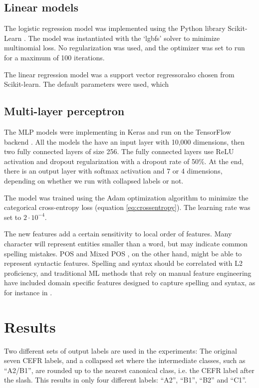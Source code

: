 \subsection{Linear models}

The logistic regression model was implemented using the Python library
Scikit-Learn \autocite{scikit-learn}. The model was instantiated with the
`lgbfs' solver to minimize multinomial loss. No regularization was used, and
the optimizer was set to run for a maximum of 100 iterations.

The linear regression model was a support vector regressoralso chosen from Scikit-learn. The default
parameters were used, which 


\subsection{Multi-layer perceptron}
\label{subsec:mlp}

The MLP models were implementing in Keras \autocite{keras} and run on the
TensorFlow backend \autocite{tensorflow}. All the models the have an input
layer with 10,000 dimensions, then two fully connected layers of size 256.
The fully connected layers use \ac{ReLU} activation and dropout
regularization with a dropout rate of 50\%. At the end, there is an output
layer with softmax activation and 7 or 4 dimensions, depending on whether we
run with collapsed labels or not.

The model was trained using the Adam optimization algorithm
\autocite{kingma2014adam} to minimize the categorical cross-entropy loss
(equation \ref{eq:crossentropy}). The learning rate was set to $2\cdot
10^{-4}$.


The new \ngram features add a certain sensitivity to local order of features.
Many character \ngrams will represent entities smaller than a word, but may
indicate common spelling mistakes. \ac{POS} and Mixed POS \ngrams, on the
other hand, might be able to represent syntactic features. Spelling and
syntax should be correlated with L2 proficiency, and traditional \ac{ML}
methods that rely on manual feature engineering have included domain specific
features designed to capture spelling and syntax, as for instance in
\textcite{vajjala17}.


\section{Results}

Two different sets of output labels are used in the experiments: The original
seven CEFR labels, and a collapsed set where the intermediate classes, such
as ``A2/B1'', are rounded up to the nearest canonical class, i.e. the CEFR
label after the slash. This results in only four different labels: ``A2'',
``B1'', ``B2'' and ``C1''.

